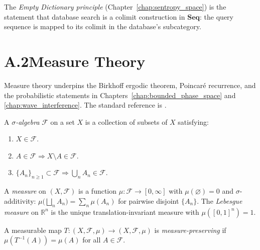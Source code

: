 The \emph{Empty Dictionary principle} (Chapter~\ref{chap:sentropy_space}) is
the statement that database search is a colimit construction in $\mathbf{Seq}$:
the query sequence is mapped to its colimit in the database's subcategory.

\section*{A.2\quad Measure Theory}
\label{app:measure_theory}

Measure theory underpins the Birkhoff ergodic theorem, Poincar\'{e} recurrence,
and the probabilistic statements in Chapters~\ref{chap:bounded_phase_space}
and \ref{chap:wave_interference}. The standard reference is \citet{rudin1987real}.

\begin{definition}
A \emph{$\sigma$-algebra} $\mathcal{F}$ on a set $X$ is a collection of
subsets of $X$ satisfying:
\begin{enumerate}[label=(\roman*)]
  \item $X \in \mathcal{F}$.
  \item $A \in \mathcal{F} \Rightarrow X \setminus A \in \mathcal{F}$.
  \item $\{A_n\}_{n \geq 1} \subset \mathcal{F} \Rightarrow \bigcup_n A_n \in \mathcal{F}$.
\end{enumerate}
\end{definition}

\begin{definition}
A \emph{measure} on $(X, \mathcal{F})$ is a function $\mu : \mathcal{F} \to [0,\infty]$
with $\mu(\varnothing) = 0$ and $\sigma$-additivity:
$\mu\!\bigl(\bigsqcup_n A_n\bigr) = \sum_n \mu(A_n)$ for pairwise disjoint
$\{A_n\}$.
The \emph{Lebesgue measure} on $\mathbb{R}^n$ is the unique translation-invariant
measure with $\mu([0,1]^n) = 1$.
\end{definition}

\begin{definition}
A measurable map $T : (X,\mathcal{F},\mu) \to (X,\mathcal{F},\mu)$ is
\emph{measure-preserving} if $\mu(T^{-1}(A)) = \mu(A)$ for all $A \in \mathcal{F}$.
\end{definition}

